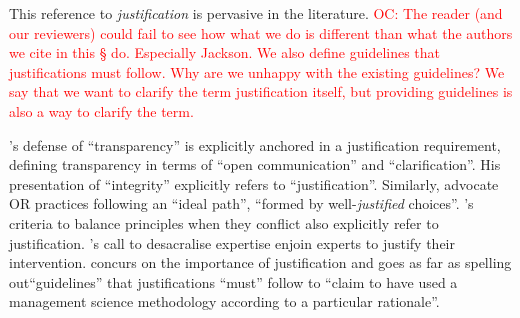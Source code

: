 \documentclass[preprint, french, english, 11pt, authoryear]{elsarticle}%
\newcommand{\commentOC}[1]{\textcolor{red}{OC: #1}}
\begin{document}
This reference to \emph{justification} is pervasive in the literature.
\commentOC{The reader (and our reviewers) could fail to see how what we do is different than what the authors we cite in this § do. Especially Jackson. We also define guidelines that justifications must follow. Why are we unhappy with the existing guidelines? We say that we want to clarify the term justification itself, but providing guidelines is also a way to clarify the term.}
\begin{changebar}\citet{diekmann_moral_2013}'s defense of ``transparency'' is explicitly anchored in a justification requirement, defining transparency in terms of ``open communication'' and ``clarification''. His presentation of ``integrity'' explicitly refers to ``justification''.
Similarly, \citet{lahtinen_why_2017} advocate \ac{OR} practices following an ``ideal path'', ``formed by well-\emph{justified} choices''.
\citet{beauchamp_principles_2009}'s criteria to balance principles when they conflict also explicitly refer to justification.
\citet{white_death_1994}'s call to desacralise expertise enjoin experts to justify their intervention.
\citet{jackson_towards_1999} concurs on the importance of justification and goes as far as spelling out``guidelines'' that justifications ``must'' follow to “claim to have used a management science methodology according to a particular rationale''.
\end{changebar}
\end{document}
